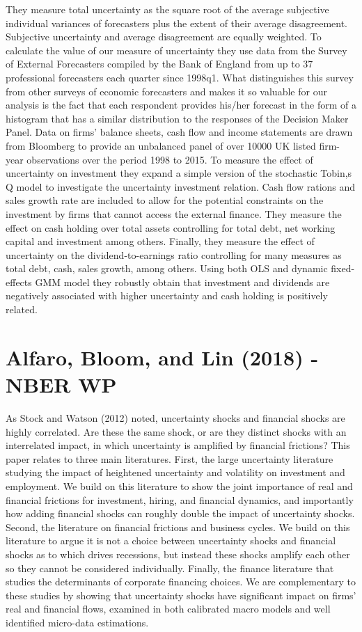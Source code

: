 \documentclass{article}
\begin{document}
{They measure total uncertainty as the square root of the average subjective individual variances of forecasters plus the extent of their average disagreement. Subjective uncertainty and average disagreement are equally weighted. To calculate the value of our measure of uncertainty they use data from the Survey of External Forecasters compiled by the Bank of England from up to 37 professional forecasters each quarter since 1998q1. What distinguishes this survey from other surveys of economic forecasters and makes it so valuable for our analysis is the fact that each respondent provides his/her forecast in the form of a histogram that has a similar distribution to the responses of the Decision Maker Panel. Data on firms' balance sheets, cash flow and income statements are drawn from Bloomberg to provide an unbalanced panel of over 10000 UK listed firm-year observations over the period 1998 to 2015. To measure the effect of uncertainty on investment they expand a simple version of the stochastic Tobin,s Q model to investigate the uncertainty investment relation. Cash flow rations and sales growth rate are included to allow for the potential constraints on the investment by firms that cannot access the external finance. They measure the effect on cash holding over total assets controlling for total debt, net working capital and investment among others. Finally, they measure the effect of uncertainty on the dividend-to-earnings ratio controlling for many measures as total debt, cash, sales growth, among others. Using both OLS and dynamic fixed-effects GMM model they robustly obtain that investment and dividends are negatively associated with higher uncertainty and cash holding is positively related.


\section{Alfaro, Bloom, and Lin (2018) - NBER WP}

As Stock and Watson (2012) noted, uncertainty shocks and financial shocks are highly correlated. Are these the same shock, or are they distinct shocks with an interrelated impact, in which uncertainty is amplified by financial frictions? This paper relates to three main literatures. First, the large uncertainty literature studying the impact of heightened uncertainty and volatility on investment and employment. We build on this literature to show the joint importance of real and financial frictions for investment, hiring, and financial dynamics, and importantly how adding financial shocks can roughly double the impact of uncertainty shocks. Second, the literature on financial frictions and business cycles. We build on this literature to argue it is not a choice between uncertainty shocks and financial shocks as to which drives recessions, but instead these shocks amplify each other so they cannot be considered individually. Finally, the finance literature that studies the determinants of corporate financing choices. We are complementary to these studies by showing that uncertainty shocks have significant impact on firms' real and financial flows, examined in both calibrated macro models and well identified micro-data estimations. 

}
\end{document}
